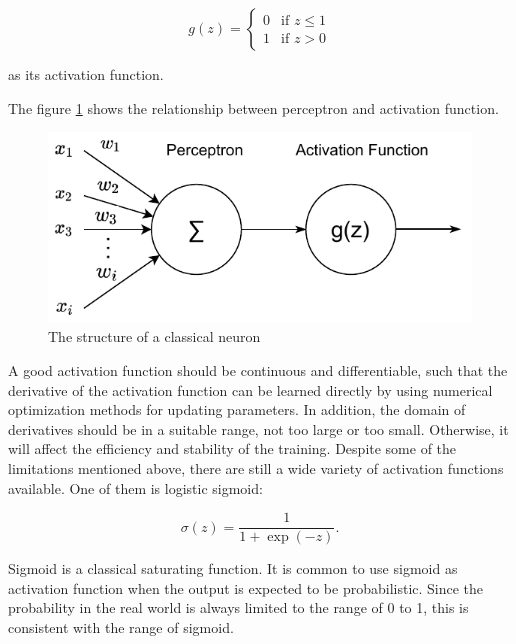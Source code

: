 \documentclass[
	parskip, 			   %
	twoside, 			   %
	DIV=14, 			   %
	BCOR=15.0mm, 		   %
	headsepline, 		   %
	open=right, 		   %
	captions=tableheading, %
	bibliography=totoc,    %
	numbers=noenddot       %
]{scrreprt}
\begin{document}
\begin{equation}
    \label{eq:activation_function}
    g(z)=\begin{cases} 0 & \text{if } z\leq 1 \\ 1  & \text{if } z>0
    \end{cases}
\end{equation}

as its activation function.

The figure \ref{fig:neuron_structure} shows the relationship between perceptron and activation function.

\begin{figure}[h!]
    \centering
    \includegraphics[scale=1]{figures/activation_function.pdf}
    \caption{The structure of a classical neuron}
    \label{fig:neuron_structure}
\end{figure}

A good activation function should be continuous and differentiable, such that the derivative of the activation function can be learned directly by using numerical optimization methods for updating parameters. In addition, the domain of derivatives should be in a suitable range, not too large or too small. Otherwise, it will affect the efficiency and stability of the training. Despite some of the limitations mentioned above, there are still a wide variety of activation functions available. One of them is logistic sigmoid:

\begin{equation}
    \label{eq:sigmoid}
    \sigma(z)=\frac{1}{1+\exp (-z)}.
\end{equation}

Sigmoid is a classical saturating function. It is common to use sigmoid as activation function when the output is expected to be probabilistic. Since the probability in the real world is always limited to the range of 0 to 1, this is consistent with the range of sigmoid.
\end{document}
